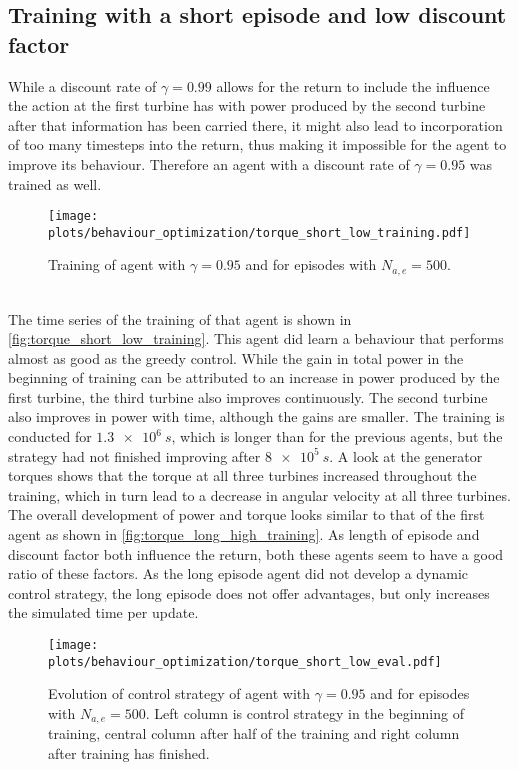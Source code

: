 \subsection{Training with a short episode and low discount factor}
While a discount rate of $\gamma=0.99$ allows for the return to include the influence the action at the first turbine has with power produced by the second turbine after that information has been carried there, it might also lead to incorporation of too many timesteps into the return, thus making it impossible for the agent to improve its behaviour. Therefore an agent with a discount rate of $\gamma=0.95$ was trained as well.
\begin{figure}[h]
	\centering
	\texttt{[image: plots/behaviour\_optimization/torque\_short\_low\_training.pdf]}
	\caption{Training of agent with $\gamma=0.95$ and for episodes with $N_{a,e}=500$.}
	\label{fig:torque_short_low_training}
\end{figure} \\
The time series of the training of that agent is shown in \autoref{fig:torque_short_low_training}. This agent did learn a behaviour that performs almost as good as the greedy control. While the gain in total power in the beginning of training can be attributed to an increase in power produced by the first turbine, the third turbine also improves continuously. The second turbine also improves in power with time, although the gains are smaller. The training is conducted for $\SI{1.3e6}{s}$, which is longer than for the previous agents, but the strategy had not finished improving after $\SI{8e5}{s}$. A look at the generator torques shows that the torque at all three turbines increased throughout the training, which in turn lead to a decrease in angular velocity at all three turbines. The overall development of power and torque looks similar to that of the first agent as shown in \autoref{fig:torque_long_high_training}. As length of episode and discount factor both influence the return, both these agents seem to have a good ratio of these factors. As the long episode agent did not develop a dynamic control strategy, the long episode does not offer advantages, but only increases the simulated time per update. 
\begin{figure}[h]
	\centering
	\texttt{[image: plots/behaviour\_optimization/torque\_short\_low\_eval.pdf]}
	\caption{Evolution of control strategy of agent with $\gamma=0.95$ and for episodes with $N_{a,e}=500$. Left column is control strategy in the beginning of training, central column after half of the training and right column after training has finished.}
	\label{fig:torque_short_low_eval}
\end{figure} \\
